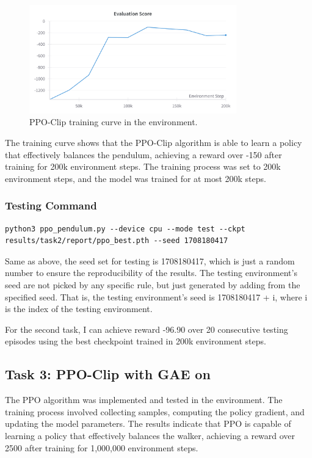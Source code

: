 \begin{figure}[H]
    \centering
    \includegraphics[width=0.8\textwidth]{figures/task2.png}
    \caption{PPO-Clip training curve in the \pendulum environment.}
    \label{fig:task2}
\end{figure}
The training curve shows that the PPO-Clip algorithm is able to learn a policy that effectively balances the pendulum, achieving a reward over -150 after training for 200k environment steps.
The training process was set to 200k environment steps, and the model was trained for at most 200k steps.

\subsubsection{Testing Command}

\begin{verbatim}
python3 ppo_pendulum.py --device cpu --mode test --ckpt results/task2/report/ppo_best.pth --seed 1708180417
\end{verbatim}

Same as above, the seed set for testing is 1708180417, which is just a random number to ensure the reproducibility of the results.
The testing environment's seed are not picked by any specific rule, but just generated by adding from the specified seed.
That is, the testing environment's seed is 1708180417 + i, where i is the index of the testing environment.

For the second task, I can achieve reward -96.90 over 20 consecutive testing episodes using the best checkpoint trained in 200k environment steps.

\subsection{Task 3: PPO-Clip with GAE on \walker}
\label{sec:task3-discussion}

The PPO algorithm was implemented and tested in the \walker environment.
The training process involved collecting samples, computing the policy gradient, and updating the model parameters.
The results indicate that PPO is capable of learning a policy that effectively balances the walker, achieving a reward over 2500 after training for 1,000,000 environment steps.

